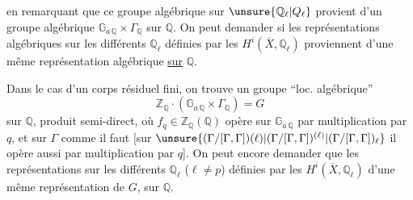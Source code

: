 en remarquant que ce groupe algébrique sur $\unsure{\mathbb Q_\ell|Q_\ell}$ provient d'un groupe algébrique  $\mathbb G_{a\,\mathbb Q}\times\Gamma_{\mathbb Q}$ sur $\mathbb Q$. On peut demander   si les représentations algébriques sur les différents $\mathbb Q_\ell$ définies par les $H^i(\overline X,\mathbb Q_\ell)$ proviennent d'une même représentation algébrique \uline{sur} $\mathbb Q$.
\margin{[N.B. \unsure{Même|M\textsuperscript{me}} la représentation induite de $\Gamma$ ne s'écrit pas en général sur $\mathbb Q$, si $i=1$ et si $X_K$ est une courbe elliptique sur $K$ ayant ``bonne réduction potentielle''.]}

Dans le cas d'un corps résiduel fini, on trouve un groupe ``loc. algébrique''
\[
 \mathbb Z_{\mathbb Q}\cdot(\mathbb G_{a\,\mathbb Q}\times\Gamma_{\mathbb Q})=G
\]
sur $\mathbb Q$, produit semi-direct, où  $f_q\in\mathbb Z_{\mathbb Q}(\mathbb Q)$ opère sur $\mathbb G_{a\,\mathbb Q}$  par multiplication par $q$, et sur $\Gamma$ comme il faut [sur $\unsure{(\Gamma/[\Gamma,\Gamma])(\ell)|(\Gamma/[\Gamma,\Gamma])^{(\ell)}|(\Gamma/[\Gamma,\Gamma])_\ell}$ il opère aussi par multiplication par $q$]. On peut encore demander que les représentations sur les différents $\mathbb Q_\ell$ ($\ell\ne p$) définies par les $H^i(\overline X,\mathbb Q_\ell)$   d'une même représentation de $G$, sur $\mathbb Q$.
